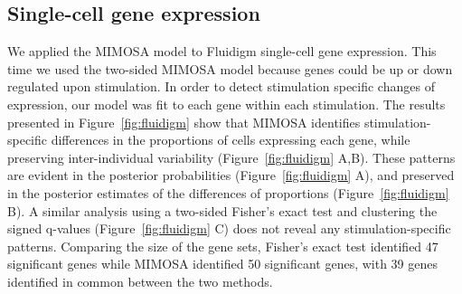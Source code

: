 \documentclass[useAMS,referee,usenatbib]{biom}
\begin{document}
\subsection{Single-cell gene expression}
We applied the MIMOSA model to Fluidigm single-cell gene expression. This time we used the two-sided MIMOSA model because genes could be up or down regulated upon stimulation. In order to detect stimulation specific changes of expression, our model was fit to each gene within each stimulation. The results presented in Figure~\ref{fig:fluidigm} show that MIMOSA identifies stimulation-specific differences in the proportions of cells expressing each gene, while preserving inter-individual variability (Figure~\ref{fig:fluidigm} A,B). These patterns are evident in the  posterior probabilities (Figure~\ref{fig:fluidigm} A), and preserved in the posterior estimates of the differences of proportions (Figure~\ref{fig:fluidigm} B). A similar analysis using a two-sided Fisher's exact test and clustering the signed q-values (Figure~\ref{fig:fluidigm} C) does not reveal any stimulation-specific patterns. Comparing the size of the gene sets, Fisher's exact test identified 47 significant genes while MIMOSA identified 50 significant genes, with 39 genes identified in common between the two methods.
 
\end{document}
